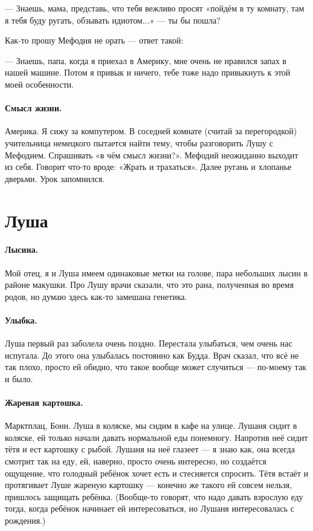\documentclass{book}
\begin{document}
--- Знаешь, мама, представь, что тебя вежливо просят «пойдём в ту комнату, там я тебя буду ругать, обзывать идиотом...» --- ты бы пошла?

Как-то прошу Мефодия не орать --- ответ такой:

--- Знаешь, папа, когда я приехал в Америку, мне очень не нравился запах в нашей машине.
Потом я привык и ничего, тебе тоже надо привыкнуть к этой моей особенности.

\paragraph{Смысл жизни.}
Америка.
Я сижу за компутером.
В соседней комнате (считай за перегородкой) учительница немецкого пытается найти тему, чтобы разговорить Лушу с Мефодием.
Спрашивать «в чём смысл жизни?».
Мефодий неожиданно выходит из себя.
Говорит что-то вроде: «Жрать и трахаться».
Далее ругань и хлопанье дверьми.
Урок запомнился.

\section*{Луша}

\paragraph{Лысина.} Мой отец, я и Луша имеем одинаковые метки на голове, пара небольших лысин в районе макушки.
Про Лушу врачи сказали, что это рана, полученная во время родов, но думаю здесь как-то замешана генетика.

\paragraph{Улыбка.} Луша первый раз заболела очень поздно.
Перестала улыбаться, чем очень нас испугала.
До этого она улыбалась постоянно как Будда.
Врач сказал, что всё не так плохо, просто ей обидно, что такое вообще может случиться --- по-моему так и было.

\paragraph{Жареная картошка.} Марктплац, Бонн.
Луша в коляске, мы сидим в кафе на улице.
Лушаня сидит в коляске, ей только начали давать нормальной еды понемногу.
Напротив неё сидит тётя и ест картошку с рыбой.
Лушаня на неё глазеет --- я знаю как, она всегда смотрит так на еду, ей, наверно, просто очень интересно, но создаётся ощущение, что голодный ребёнок хочет есть и стесняется спросить.
Тётя встаёт и протягивает Луше жареную картошку --- конечно же такого ей совсем нельзя, пришлось защищать ребёнка.
(Вообще-то говорят, что надо давать взрослую еду тогда, когда ребёнок начинает ей интересоваться, но Лушаня интересовалась с рождения.)
\end{document}
